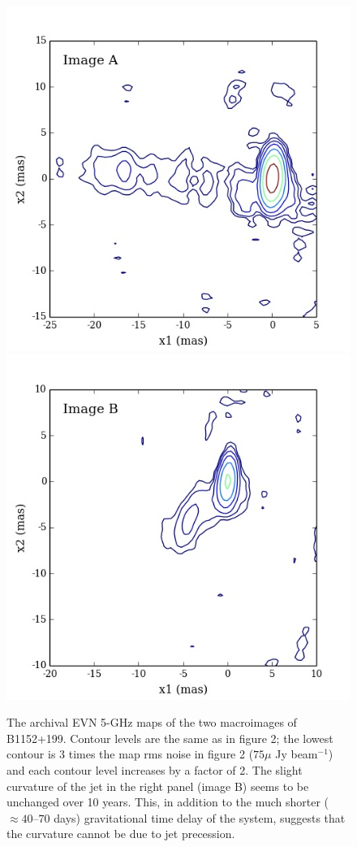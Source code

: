 \documentclass[a4paper, 11pt]{article}
\begin{document}
\begin{figure}[tbh]
\centering
\includegraphics[scale=0.35]{imageA.jpg}
\includegraphics[scale=0.35]{imageB.jpg}
\caption{The archival EVN 5-GHz maps of the two macroimages of B1152+199. Contour levels are the same as in figure 2; the lowest contour is 3 times the map rms noise in figure 2 ($75 \mu$ Jy beam$^{-1}$) and each contour level increases by a factor of 2. The slight curvature of the jet in the right panel (image B) seems to be unchanged over 10 years. This, in addition to the much shorter ($\approx 40$--$70$ days) gravitational time delay of the system, suggests that the curvature cannot be due to jet precession.}
\end{figure}
\end{document}

